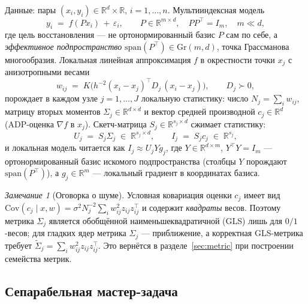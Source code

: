 \documentclass[11pt,a4paper]{article}
\newcommand{\R}{\mathbb{R}}
\newcommand{\Id}{I}
\newcommand{\T}{^{\!\top}}
\newcommand{\Gr}{\mathrm{Gr}}
\newcommand{\spanop}{\mathrm{span}}
\theoremstyle{plain}
\theoremstyle{definition}
\theoremstyle{remark}
\newtheorem{remark}[theorem]{Замечание}
\begin{document}
Данные: пары $(x_i,y_i)\in\R^d\times\R$, $i=1,\dots,n$. Мультииндексная модель
\begin{equation}\label{eq:model}
y_i \;=\; f(Px_i)\,+\,\varepsilon_i,\qquad
P\in\R^{m\times d},\quad PP\T=\Id_m,\quad m\ll d,
\end{equation}
где цель восстановления --- не ортонормированный базис $P$ сам по себе, а
\emph{эффективное подпространство} $\spanop(P\T)\in\Gr(m,d)$, точка
Грассманова многообразия. Локальная линейная аппроксимация $f$ в окрестности
точки $x_j$ с анизотропными весами
\begin{equation}\label{eq:weights}
w_{ij} \;=\; K\!\bigl(h^{-2}(x_i-x_j)\T D_j\,(x_i-x_j)\bigr),\qquad D_j\succ 0,
\end{equation}
порождает в каждом узле $j=1,\dots,J$ локальную статистику: число $N_j=\sum_i w_{ij}$,
матрицу вторых моментов $\Sigma_j\in\R^{d\times d}$ и вектор средней производной
$c_j\in\R^d$ (ADP-оценка $\nabla f$ в $x_j$). Скетч-матрица $S_j\in\R^{s_j\times d}$
сжимает статистику:
\begin{equation}\label{eq:sketch}
U_j \;=\; S_j\Sigma_j\;\in\;\R^{s_j\times d},\qquad
I_j \;=\; S_j c_j\;\in\;\R^{s_j},
\end{equation}
и локальная модель читается как $I_j \approx U_j Y g_j$, где $Y\in\R^{d\times m}$,
$Y\T Y=\Id_m$ --- ортонормированный базис искомого подпространства (столбцы $Y$
порождают $\spanop(P\T)$), а $g_j\in\R^m$ --- локальный градиент в координатах
базиса.

\begin{remark}[Оговорка о шуме]\label{rem:noise}
Условная ковариация оценки $c_j$ имеет вид
$\mathrm{Cov}(c_j\mid x,w)=\sigma^2 N_j^{-2}\sum_i w_{ij}^2 z_{ij}z_{ij}\T$ и
содержит \emph{квадраты} весов. Поэтому метрика $\Sigma_j$ является обобщённой
наименьшеквадратичной (GLS) лишь для $0/1$-весов; для гладких ядер метрика
$\Sigma_j$ --- приближение, а корректная GLS-метрика требует
$\widetilde\Sigma_j=\sum_i w_{ij}^2 z_{ij}z_{ij}\T$. Это вернётся в
разделе~\ref{sec:metric} при построении семейства метрик.
\end{remark}

\subsection{Сепарабельная мастер-задача}
\end{document}

